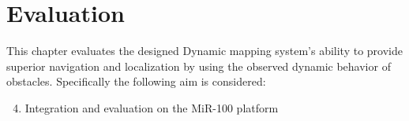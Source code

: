 \chapter{Evaluation}
This chapter evaluates the designed Dynamic mapping system's ability to provide superior navigation and localization by using the observed dynamic behavior of obstacles.
Specifically the following aim is considered:

\begin{enumerate}
    \setcounter{enumi}{3}
    \item Integration and evaluation on the MiR-100 platform
\end{enumerate}










